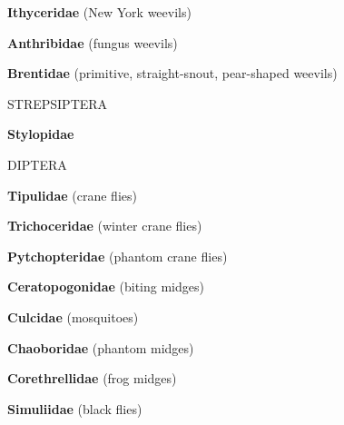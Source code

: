 \documentclass[letterpaper,10pt]{article}
\begin{document}
{%
\makebox[0.6cm]{}  \textbf{Ithyceridae} (New York weevils) \par
\makebox[0.6cm]{}  \textbf{Anthribidae} (fungus weevils) \par
\makebox[0.6cm]{}  \textbf{Brentidae} (primitive, straight-snout, pear-shaped weevils) \par
%
%
%
\makebox[0.0cm]{}  STREPSIPTERA \par
\makebox[0.6cm]{}  \textbf{Stylopidae} \par
%
%
%
\makebox[0.0cm]{}  DIPTERA \par
\makebox[0.6cm]{}  \textbf{Tipulidae} (crane flies) \par
\makebox[0.6cm]{}  \textbf{Trichoceridae} (winter crane flies) \par
\makebox[0.6cm]{}  \textbf{Pytchopteridae} (phantom crane flies) \par
\makebox[0.6cm]{}  \textbf{Ceratopogonidae} (biting midges) \par
\makebox[0.6cm]{}  \textbf{Culcidae} (mosquitoes) \par
\makebox[0.6cm]{}  \textbf{Chaoboridae} (phantom midges) \par
\makebox[0.6cm]{}  \textbf{Corethrellidae} (frog midges) \par
\makebox[0.6cm]{}  \textbf{Simuliidae} (black flies) \par
}
\end{document}
